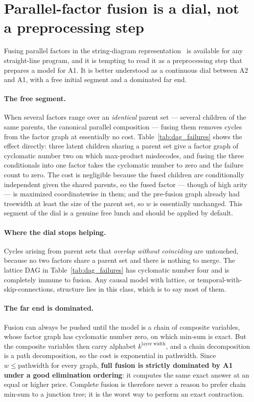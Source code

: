 \section{Parallel-factor fusion is a dial, not a preprocessing step}
\label{sec:fusion}

Fusing parallel factors in the string-diagram representation~\citep{Sennesh2023} is available for any straight-line program, and it is tempting to read it as a preprocessing step that prepares a model for A1. It is better understood as a continuous dial between A2 and A1, with a free initial segment and a dominated far end.

\paragraph{The free segment.} When several factors range over an \emph{identical} parent set --- several children of the same parents, the canonical parallel composition --- fusing them removes cycles from the factor graph at essentially no cost. Table~\ref{tab:dag_failures} shows the effect directly: three latent children sharing a parent set give a factor graph of cyclomatic number two on which max-product misdecodes, and fusing the three conditionals into one factor takes the cyclomatic number to zero and the failure count to zero. The cost is negligible because the fused children are conditionally independent given the shared parents, so the fused factor --- though of high arity --- is maximized coordinatewise in them; and the pre-fusion graph already had treewidth at least the size of the parent set, so $w$ is essentially unchanged. This segment of the dial is a genuine free lunch and should be applied by default.

\paragraph{Where the dial stops helping.} Cycles arising from parent sets that \emph{overlap without coinciding} are untouched, because no two factors share a parent set and there is nothing to merge. The lattice DAG in Table~\ref{tab:dag_failures} has cyclomatic number four and is completely immune to fusion. Any causal model with lattice, or temporal-with-skip-connections, structure lies in this class, which is to say most of them.

\paragraph{The far end is dominated.} Fusion can always be pushed until the model is a chain of composite variables, whose factor graph has cyclomatic number zero, on which min-sum is exact. But the composite variables then carry alphabet $k^{\text{layer width}}$, and a chain decomposition is a path decomposition, so the cost is exponential in pathwidth. Since $w \leq \mathrm{pathwidth}$ for every graph, \textbf{full fusion is strictly dominated by A1 under a good elimination ordering}: it computes the same exact answer at an equal or higher price. Complete fusion is therefore never a reason to prefer chain min-sum to a junction tree; it is the worst way to perform an exact contraction.

